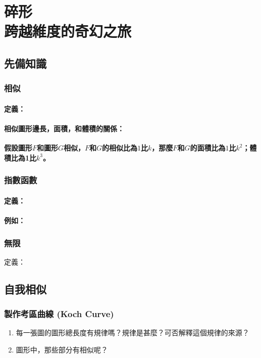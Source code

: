 \chapter{碎形\\跨越維度的奇幻之旅}

\section{先備知識}
\subsection{相似}
\noindent
\subsubsection{定義：}
\vspace{2.5em}
\subsubsection{相似圖形邊長，面積，和體積的關係：}
\vspace{2.5em}
\textbf{假設圖形$F$和圖形$G$相似，$F$和$G$的相似比為$1$比$k$，那麼$F$和$G$的面積比為$1$比$k^2$；體積比為1比$k^3$。}

\subsection{指數函數}
\noindent
\subsubsection{定義：}
\subsubsection{例如：}
\subsection{無限}
\noindent
定義：
\newpage
\section{自我相似}
\subsection{製作考區曲線 (Koch Curve)}
\vspace{7.5cm}
\begin{enumerate}
\item 每一張圖的圖形總長度有規律嗎？規律是甚麼？可否解釋這個規律的來源？
\item 圖形中，那些部分有相似呢？
\end{enumerate}

